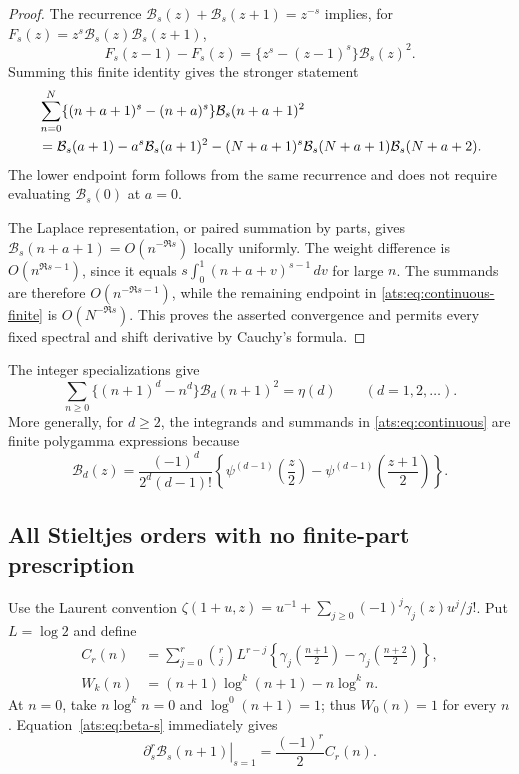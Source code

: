 \documentclass[11pt,a4paper]{article}
\numberwithin{equation}{section}
\theoremstyle{definition}
\theoremstyle{remark}
\begin{document}
\begin{proof}
The recurrence
$\mathcal B_s(z)+\mathcal B_s(z+1)=z^{-s}$ implies, for
$F_s(z)=z^s\mathcal B_s(z)\mathcal B_s(z+1)$,
\[
 F_s(z-1)-F_s(z)=\{z^s-(z-1)^s\}\mathcal B_s(z)^2.
\]
Summing this finite identity gives the stronger statement
\begin{align}\label{ats:eq:continuous-finite}
 &\sum_{n=0}^{N}\{(n+a+1)^s-(n+a)^s\}
                          \mathcal B_s(n+a+1)^2\notag\\
 &=\mathcal B_s(a+1)-a^s\mathcal B_s(a+1)^2
 -(N+a+1)^s\mathcal B_s(N+a+1)\mathcal B_s(N+a+2).
\end{align}
The lower endpoint form follows from the same recurrence and does
not require evaluating $\mathcal B_s(0)$ at $a=0$.

The Laplace representation, or paired summation by parts, gives
$\mathcal B_s(n+a+1)=O(n^{-\Re s})$ locally uniformly. The weight
difference is $O(n^{\Re s-1})$, since it equals
$s\int_0^1(n+a+v)^{s-1}\,dv$ for large $n$.
The summands are therefore $O(n^{-\Re s-1})$, while the remaining
endpoint in \eqref{ats:eq:continuous-finite} is $O(N^{-\Re s})$.
This proves the asserted convergence and permits every fixed
spectral and shift derivative by Cauchy's formula.
\end{proof}

The integer specializations give
\[
 \sum_{n\ge0}\{(n+1)^d-n^d\}\mathcal B_d(n+1)^2=\eta(d)
 \qquad(d=1,2,\ldots).
\]
More generally, for $d\ge2$, the integrands and summands in
\eqref{ats:eq:continuous} are finite polygamma expressions because
\[
 \mathcal B_d(z)=
 \frac{(-1)^d}{2^d(d-1)!}
 \left\{\psi^{(d-1)}\left(\frac z2\right)
       -\psi^{(d-1)}\left(\frac{z+1}{2}\right)\right\}.
\]

\subsection{All Stieltjes orders with no finite-part prescription}

Use the Laurent convention
$\zeta(1+u,z)=u^{-1}+\sum_{j\ge0}(-1)^j\gamma_j(z)u^j/j!$.
Put $L=\log2$ and define
\begin{align*}
 C_r(n)&=\sum_{j=0}^{r}\binom rj L^{r-j}
 \left\{\gamma_j\left(\frac{n+1}{2}\right)
       -\gamma_j\left(\frac{n+2}{2}\right)\right\},\\
 W_k(n)&=(n+1)\log^k(n+1)-n\log^k n.
\end{align*}
At $n=0$, take $n\log^k n=0$ and $\log^0(n+1)=1$;
thus $W_0(n)=1$ for every $n$. Equation~\eqref{ats:eq:beta-s}
immediately gives
\[
 \left.\partial_s^r\mathcal B_s(n+1)\right|_{s=1}
       =\frac{(-1)^r}{2}C_r(n).
\]
\end{document}
